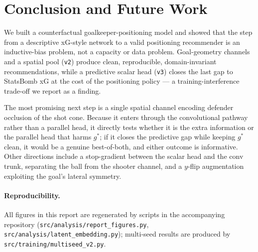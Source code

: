 \documentclass[11pt,a4paper]{article}
\newcommand{\gopt}{g^{*}}
\begin{document}
\section{Conclusion and Future Work}

We built a counterfactual goalkeeper-positioning model and showed that the step
from a descriptive xG-style network to a valid positioning recommender is an
inductive-bias problem, not a capacity or data problem. Goal-geometry channels
and a spatial pool (\texttt{v2}) produce clean, reproducible, domain-invariant
recommendations, while a predictive scalar head (\texttt{v3}) closes the last gap
to StatsBomb xG at the cost of the positioning policy --- a training-interference
trade-off we report as a finding.

The most promising next step is a single spatial channel encoding defender
occlusion of the shot cone. Because it enters through the convolutional pathway
rather than a parallel head, it directly tests whether it is the extra
information or the parallel head that harms $\gopt$; if it closes the predictive
gap while keeping $\gopt$ clean, it would be a genuine best-of-both, and either
outcome is informative. Other directions include a stop-gradient between the
scalar head and the conv trunk, separating the ball from the shooter channel, and
a $y$-flip augmentation exploiting the goal's lateral symmetry.

\paragraph{Reproducibility.}
All figures in this report are regenerated by scripts in the accompanying
repository (\texttt{src/analysis/report\_figures.py},
\texttt{src/analysis/latent\_embedding.py}); multi-seed results are produced by
\texttt{src/training/multiseed\_v2.py}.



\end{document}
